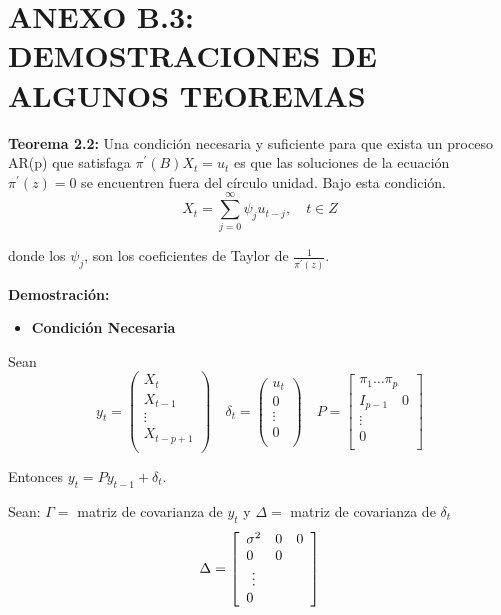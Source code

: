 \section{ANEXO B.3: DEMOSTRACIONES DE ALGUNOS TEOREMAS}\newline

\textbf{Teorema 2.2:} Una condici\'{o}n necesaria y suficiente para que exista un proceso AR(p) que satisfaga $\pi^{'}\left( B \right)X_{t} =u_{t}$ es que las soluciones de la ecuaci\'{o}n $\pi^{'}\left( z \right)=0$ se encuentren fuera del c\'{i}rculo unidad. Bajo esta condici\'{o}n.
\[
X_{t} =\sum\limits_{j=0}^\infty {\psi_{j} u_{t-j} },\quad t\in Z
\]

donde los $\psi_{j}$, son los coeficientes de Taylor de $\frac{1}{\pi^{'}\left( z \right)}$.\newline

\textbf{Demostraci\'{o}n:}

\begin{itemize}
      \item \textbf{Condici\'{o}n Necesaria} 
\end{itemize}

Sean
\[
y_{t} =\left(\begin{array}{c}
 X_{t} \\ 
 X_{t-1} \\ 
 \vdots \\ 
 X_{t-p+1} \\ 
 \end{array}\right)
\quad
\delta_{t} =\left(\begin{array}{c}
 u_{t} \\ 
 0 \\ 
 \vdots \\ 
 0 \\ 
 \end{array}\right)
\quad
P=\left[\begin{array}{c}
 \pi_{1} \ldots \pi_{p} \\ 
 I_{p-1}\quad 0\\
 \vdots\\
 0\\
\end{array} \right]
\]

Entonces $y_{t} =Py_{t-1} +\delta_{t}$.\newline

Sean: $\Gamma=$ matriz de covarianza de $y_{t}$ y $\Delta =$ matriz de covarianza de $\delta_{t}$
\[
\Delta =
\left[ {{\begin{array}{*{20}c}
 {\sigma^{2}} \hfill & 0 \hfill & 0 \hfill \\
 0  \hfill & 0  \hfill & \hfill \\
 \vdots & & \\
 0 \hfill & \hfill & \hfill \\
\end{array} }} \right]
\]

